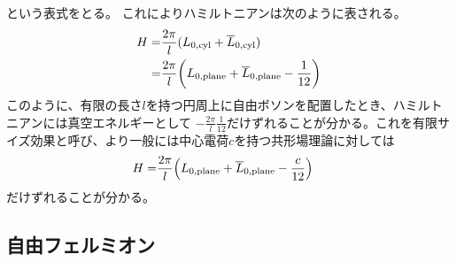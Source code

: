 \documentclass[11pt, dvipdfmx]{article}
\numberwithin{equation}{section}
\begin{document}
        という表式をとる。
これによりハミルトニアンは次のように表される。
\begin{align}
    H=&\frac{2\pi}{l}(L_{0,\text{cyl}} + \overline{L}_{0,\text{cyl}})\\
    =&\frac{2\pi}{l}\qty(L_{0,\text{plane}}+ \overline{L}_{0,\text{plane}} - \frac{1}{12})
\end{align}
このように、有限の長さ$l$を持つ円周上に自由ボソンを配置したとき、ハミルトニアンには真空エネルギーとして
$-\frac{2\pi}{l}\frac{1}{12}$だけずれることが分かる。これを有限サイズ効果と呼び、より一般には中心電荷$c$を持つ共形場理論に対しては
\begin{align}
    H=&\frac{2\pi}{l}\qty(L_{0,\text{plane}}+ \overline{L}_{0,\text{plane}} - \frac{c}{12})
\end{align}
だけずれることが分かる。
\subsection{自由フェルミオン}
\end{document}
